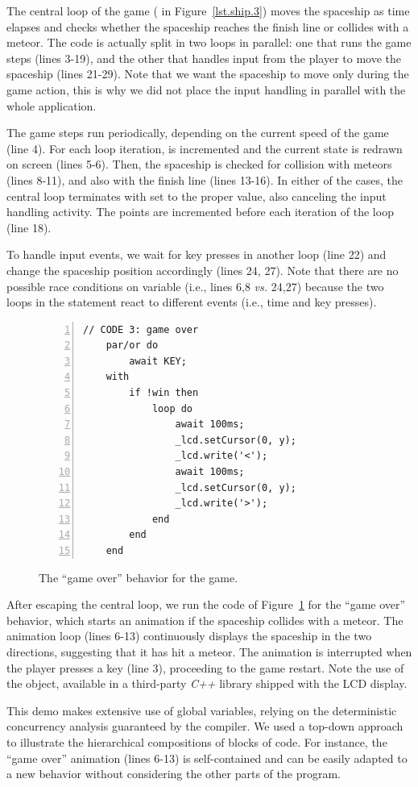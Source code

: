 The central loop of the game (  in Figure~\ref{lst.ship.3}) moves 
the spaceship as time elapses and checks whether the spaceship reaches the 
finish line or collides with a meteor.
%
The code is actually split in two loops in parallel: one that runs the game 
steps (lines 3-19), and the other that handles input from the player to move 
the spaceship (lines 21-29).
Note that we want the spaceship to move only during the game action, this is 
why we did not place the input handling in parallel with the whole application.

The game steps run periodically, depending on the current speed of the game 
(line 4).
For each loop iteration,  is incremented and the current state is 
redrawn on screen (lines 5-6).
Then, the spaceship is checked for collision with meteors (lines 8-11), and 
also with the finish line (lines 13-16).
In either of the cases, the central loop terminates with  set to the 
proper value, also canceling the input handling activity.
The points are incremented before each iteration of the loop (line 18).

To handle input events, we wait for key presses in another loop (line 22) and 
change the spaceship position accordingly (lines 24, 27).
Note that there are no possible race conditions on variable  (i.e., 
lines 6,8 \emph{vs.} 24,27) because the two loops in the  
statement react to different events (i.e., time and key presses).

\begin{figure}[ht]
\begin{lstlisting}[numbers=left,xleftmargin=2em]
    // CODE 3: game over
    par/or do
        await KEY;
    with
        if !win then
            loop do
                await 100ms;
                _lcd.setCursor(0, y);
                _lcd.write('<');
                await 100ms;
                _lcd.setCursor(0, y);
                _lcd.write('>');
            end
        end
    end
\end{lstlisting}
\caption{ The ``game over'' behavior for the game.
{\small %
}%
\label{lst.ship.4}
}
\end{figure}

After escaping the central loop, we run the code of Figure~\ref{lst.ship.4} for 
the ``game over'' behavior, which starts an animation if the spaceship collides 
with a meteor.
%
The animation loop (lines 6-13) continuously displays the spaceship in the two 
directions, suggesting that it has hit a meteor.
The animation is interrupted when the player presses a key (line 3), proceeding 
to the game restart.
Note the use of the  object, available in a third-party \emph{C++} 
library shipped with the LCD display.%

This demo makes extensive use of global variables, relying on the
deterministic concurrency analysis guaranteed by the \CEU compiler.
We used a top-down approach to illustrate the hierarchical compositions of 
blocks of code.
For instance, the ``game over'' animation (lines 6-13) is self-contained and 
can be easily adapted to a new behavior without considering the other parts of 
the program.
